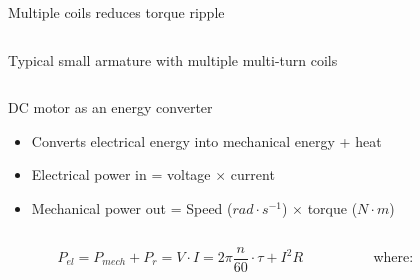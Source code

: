\documentclass[compress]{beamer}
\begin{document}
\begin{frame}{Multiple coils reduces torque ripple}
\begin{columns}
\begin{column}{0.5\linewidth}
\begin{center}
                Typical small armature with multiple multi-turn coils
            \end{center}
        \end{column}
    \end{columns}


\end{frame}


\begin{frame}{DC motor as an energy converter}


\begin{itemize}

\item Converts electrical energy into mechanical energy + heat
\item Electrical power in = voltage $\times$ current
\item Mechanical power out = Speed ($rad \cdot s^{-1}$) $\times$ torque ($N\cdot m$)
\end{itemize}

    \begin{columns}
        \begin{column}{0.7\linewidth}
    \begin{center}

    \[
        P_{el} = P_{mech} + P_{r} = V\cdot I = 2\pi\frac{n}{60}\cdot \tau + I^2 R
    \]
    \end{center}

        \end{column}
        \begin{column}{0.3\linewidth}
    \footnotesize
    where:


\end{column}
\end{columns}
\end{frame}
\end{document}
